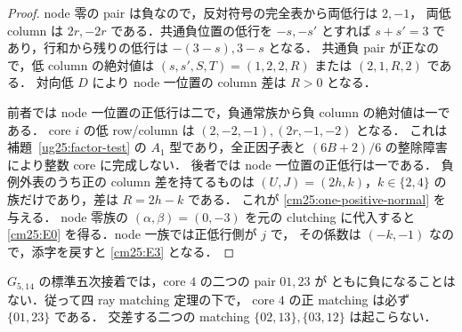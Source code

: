\begin{proof}
node 零の pair は負なので，反対符号の完全表から両低行は $2,-1$，
両低 column は $2r,-2r$ である．共通負位置の低行を $-s,-s'$ とすれば
$s+s'=3$ であり，行和から残りの低行は $-(3-s),3-s$ となる．
共通負 pair が正なので，低 column の絶対値は
$(s,s',S,T)=(1,2,2,R)$ または $(2,1,R,2)$ である．
対向低 $D$ により node 一位置の column 差は $R>0$ となる．

前者では node 一位置の正低行は二で，負通常族から負 column の絶対値は一である．
core $i$ の低 row/column は $(2,-2,-1),(2r,-1,-2)$ となる．
これは補題~\ref{ug25:factor-test} の $A_1$ 型であり，全正因子表と
$(6B+2)/6$ の整除障害により整数 core に完成しない．
後者では node 一位置の正低行は一である．
負例外表のうち正の column 差を持てるものは
$(U,J)=(2h,k)$，$k\in\{2,4\}$ の族だけであり，差は $R=2h-k$ である．
これが \eqref{cm25:one-positive-normal} を与える．
node 零族の $(\alpha,\beta)=(0,-3)$ を元の clutching に代入すると
\eqref{cm25:E0} を得る．node 一族では正低行側が $j$ で，
その係数は $(-k,-1)$ なので，添字を戻すと \eqref{cm25:E3} となる．
\end{proof}

\begin{theorem}\label{cm25:central}
$G_{5,14}$ の標準五次接着では，core $4$ の二つの pair $01,23$ が
ともに負になることはない．従って四 ray matching 定理の下で，
core $4$ の正 matching は必ず $\{01,23\}$ である．
交差する二つの matching $\{02,13\},\{03,12\}$ は起こらない．
\end{theorem}


